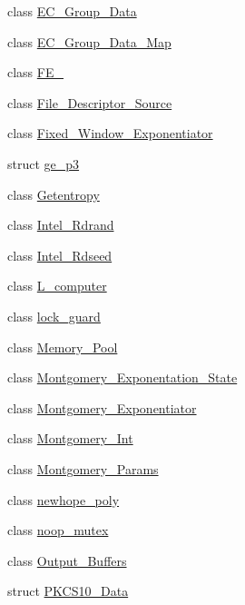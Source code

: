 \begin{DoxyCompactItemize}
\item 
class \mbox{\hyperlink{class_botan_1_1_e_c___group___data}{E\+C\+\_\+\+Group\+\_\+\+Data}}
\item 
class \mbox{\hyperlink{class_botan_1_1_e_c___group___data___map}{E\+C\+\_\+\+Group\+\_\+\+Data\+\_\+\+Map}}
\item 
class \mbox{\hyperlink{class_botan_1_1_f_e__25519}{F\+E\+\_}}
\item 
class \mbox{\hyperlink{class_botan_1_1_file___descriptor___source}{File\+\_\+\+Descriptor\+\_\+\+Source}}
\item 
class \mbox{\hyperlink{class_botan_1_1_fixed___window___exponentiator}{Fixed\+\_\+\+Window\+\_\+\+Exponentiator}}
\item 
struct \mbox{\hyperlink{struct_botan_1_1ge__p3}{ge\+\_\+p3}}
\item 
class \mbox{\hyperlink{class_botan_1_1_getentropy}{Getentropy}}
\item 
class \mbox{\hyperlink{class_botan_1_1_intel___rdrand}{Intel\+\_\+\+Rdrand}}
\item 
class \mbox{\hyperlink{class_botan_1_1_intel___rdseed}{Intel\+\_\+\+Rdseed}}
\item 
class \mbox{\hyperlink{class_botan_1_1_l__computer}{L\+\_\+computer}}
\item 
class \mbox{\hyperlink{class_botan_1_1lock__guard}{lock\+\_\+guard}}
\item 
class \mbox{\hyperlink{class_botan_1_1_memory___pool}{Memory\+\_\+\+Pool}}
\item 
class \mbox{\hyperlink{class_botan_1_1_montgomery___exponentation___state}{Montgomery\+\_\+\+Exponentation\+\_\+\+State}}
\item 
class \mbox{\hyperlink{class_botan_1_1_montgomery___exponentiator}{Montgomery\+\_\+\+Exponentiator}}
\item 
class \mbox{\hyperlink{class_botan_1_1_montgomery___int}{Montgomery\+\_\+\+Int}}
\item 
class \mbox{\hyperlink{class_botan_1_1_montgomery___params}{Montgomery\+\_\+\+Params}}
\item 
class \mbox{\hyperlink{class_botan_1_1newhope__poly}{newhope\+\_\+poly}}
\item 
class \mbox{\hyperlink{class_botan_1_1noop__mutex}{noop\+\_\+mutex}}
\item 
class \mbox{\hyperlink{class_botan_1_1_output___buffers}{Output\+\_\+\+Buffers}}
\item 
struct \mbox{\hyperlink{struct_botan_1_1_p_k_c_s10___data}{P\+K\+C\+S10\+\_\+\+Data}}

\end{DoxyCompactItemize}
